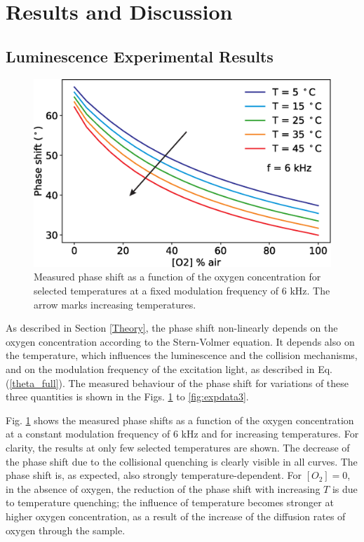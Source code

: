 \documentclass[final,5p,times,twocolumn]{elsarticle}
\begin{document}
\section{Results and Discussion}
\label{Results}

\subsection{Luminescence Experimental Results}

\begin{figure}[b!]
\centering
\includegraphics[width=8.2 cm]{phase_O2_T.eps}
\caption{Measured phase shift as a function of the oxygen concentration for selected temperatures at a fixed modulation frequency of 6 kHz. The arrow marks increasing temperatures.}
\label{fig:expdata1}
\end{figure}

As described in Section \ref{Theory}, the phase shift non-linearly depends on the oxygen concentration according to the Stern-Volmer equation. It depends also on the temperature, which influences the luminescence and the collision mechanisms, and on the modulation frequency of the excitation light, as described in Eq. (\ref{theta_full}). The measured behaviour of the phase shift for variations of these three quantities is shown in the Figs. \ref{fig:expdata1} to \ref{fig:expdata3}.

Fig. \ref{fig:expdata1} shows the measured phase shifts as a function of the oxygen concentration at a constant modulation frequency of 6 kHz and for increasing temperatures. For clarity, the results at only few selected temperatures are shown. The decrease of the phase shift due to the collisional quenching is clearly visible in all curves. The phase shift is, as expected, also strongly  temperature-dependent. For $[O_2]=0$, in the absence of oxygen, the reduction of the phase shift with increasing $T$ is due to temperature quenching; the influence of temperature becomes stronger at higher oxygen concentration, as a result of the increase of the diffusion rates of oxygen through the sample.
\end{document}
